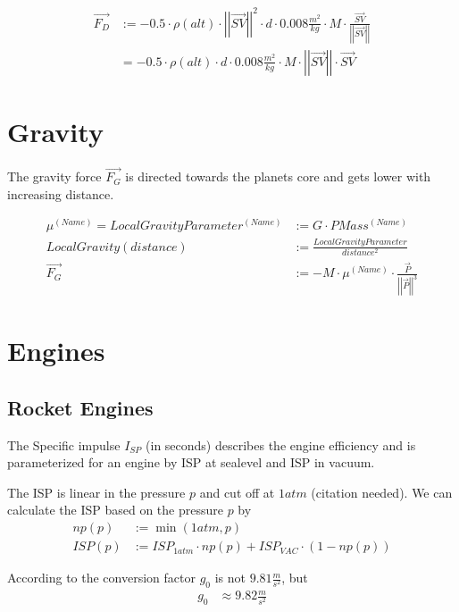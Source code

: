 \documentclass[11pt]{report}
\newcommand{\oa}[1]{\overrightarrow{#1}}
\newcommand{\F}[1]{\oa{F_{#1}}}
\newcommand{\Pos}{\oa{P}}
\newcommand{\absvec}[1]{\left|\left|{#1}\right|\right|}
\begin{document}
\begin{align}
  \F{D} &:= - 0.5 \cdot \rho(alt)\cdot \absvec{\oa{SV}}^2\cdot d \cdot 0.008\frac{m^2}{kg} \cdot M \cdot \frac{\oa{SV}}{\absvec{\oa{SV}}} \nonumber\\
  &= - 0.5 \cdot \rho(alt)\cdot d \cdot 0.008\frac{m^2}{kg} \cdot M \cdot \absvec{\oa{SV}} \cdot \oa{SV}
\end{align}

\section{Gravity}

The  gravity force $\F{G}$ is directed towards the
planets core and gets lower with increasing distance.

\begin{align}
  \mu^{(Name)} = LocalGravityParameter^{(Name)} &:= G \cdot PMass^{(Name)} \nonumber\\
  LocalGravity(distance) &:= \frac{LocalGravityParameter}{distance^2}\label{LocalGravityEquation}\\
  \F{G} &:= - M \cdot \mu^{(Name)}\cdot\frac{\Pos}{\absvec{\Pos}^3}
\end{align}

\section{Engines}

\subsection{Rocket Engines}

The  Specific impulse $I_{SP}$ (in seconds) describes the
engine efficiency and is parameterized for an engine by ISP at
sealevel and ISP in vacuum.

The ISP is linear in the pressure $p$ and cut off at $1atm$
(citation needed).  We can calculate the ISP based on the pressure
$p$ by
\begin{align}
  np(p) &:= \min(1 atm, p)\\
  ISP(p) &:= ISP_{1atm} \cdot np(p) + ISP_{VAC} \cdot (1-np(p))
\end{align}

According to \cite{ECF} the conversion factor $g_0$ is not
$9.81\frac{m}{s^2}$, but
\begin{align}
  g_0 &\approx 9.82\frac{m}{s^2}
\end{align}
\end{document}
